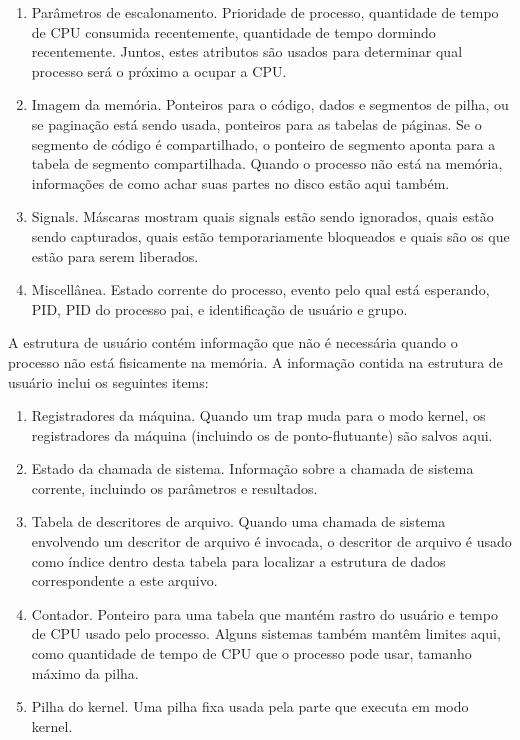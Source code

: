 \begin{enumerate}
\item Parâmetros de escalonamento. Prioridade de processo, quantidade de tempo de CPU consumida recentemente, quantidade de tempo dormindo recentemente. Juntos, estes atributos são usados para determinar qual processo será o próximo a ocupar a CPU.
\item Imagem da memória. Ponteiros para o código, dados e segmentos de pilha, ou se 	paginação está sendo usada, ponteiros para as tabelas de páginas. Se o segmento de 	código é compartilhado, o ponteiro de segmento aponta para a tabela de segmento 	compartilhada. Quando o processo não está na memória, informações de como achar suas 	partes no disco estão aqui também.
\item Signals. Máscaras mostram quais signals estão sendo ignorados, quais estão sendo 	capturados, quais estão temporariamente bloqueados e quais são os que estão para serem 	liberados. 
\item Miscellânea. Estado corrente do processo, evento pelo qual está esperando, PID, PID do 	processo pai, e identificação de usuário e grupo.
\end{enumerate}

A estrutura de usuário contém informação que não é necessária quando o processo não está fisicamente na memória. A informação contida na estrutura de usuário inclui os seguintes items:

\begin{enumerate}
\item Registradores da máquina. Quando um trap muda para o modo kernel, os registradores da máquina (incluindo os de ponto-flutuante) são salvos aqui.
\item Estado da chamada de sistema. Informação sobre a chamada de sistema corrente, incluindo os parâmetros e resultados.
\item Tabela de descritores de arquivo. Quando uma chamada de sistema envolvendo um descritor de arquivo é invocada, o descritor de arquivo é  usado como índice dentro desta tabela para localizar a estrutura de dados  correspondente a este arquivo. 
\item Contador. Ponteiro para uma tabela que mantém rastro do usuário e tempo de CPU usado pelo processo. Alguns sistemas também mantêm limites  aqui, como quantidade de tempo de CPU que o processo pode usar, tamanho máximo da pilha.
\item Pilha do kernel. Uma pilha fixa usada pela parte que executa em modo kernel.
\end{enumerate}

